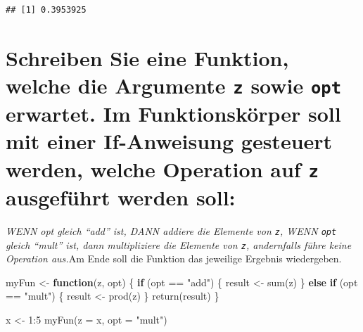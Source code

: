 \documentclass[12pt,a4paper]{article}
\newenvironment{Shaded}{\begin{snugshade}}{\end{snugshade}}
\newcommand{\AttributeTok}[1]{\textcolor[rgb]{0.77,0.63,0.00}{#1}}
\newcommand{\ControlFlowTok}[1]{\textcolor[rgb]{0.13,0.29,0.53}{\textbf{#1}}}
\newcommand{\DecValTok}[1]{\textcolor[rgb]{0.00,0.00,0.81}{#1}}
\newcommand{\FunctionTok}[1]{\textcolor[rgb]{0.00,0.00,0.00}{#1}}
\newcommand{\NormalTok}[1]{#1}
\newcommand{\OtherTok}[1]{\textcolor[rgb]{0.56,0.35,0.01}{#1}}
\newcommand{\SpecialCharTok}[1]{\textcolor[rgb]{0.00,0.00,0.00}{#1}}
\newcommand{\StringTok}[1]{\textcolor[rgb]{0.31,0.60,0.02}{#1}}
\begin{document}
\begin{verbatim}
## [1] 0.3953925
\end{verbatim}

\hypertarget{schreiben-sie-eine-funktion-welche-die-argumente-z-sowie-opt-erwartet.-im-funktionskuxf6rper-soll-mit-einer-if-anweisung-gesteuert-werden-welche-operation-auf-z-ausgefuxfchrt-werden-soll}{%
\section{\texorpdfstring{Schreiben Sie eine Funktion, welche die
Argumente \texttt{z} sowie \texttt{opt} erwartet. Im Funktionskörper
soll mit einer If-Anweisung gesteuert werden, welche Operation auf
\texttt{z} ausgeführt werden
soll:}{Schreiben Sie eine Funktion, welche die Argumente z sowie opt erwartet. Im Funktionskörper soll mit einer If-Anweisung gesteuert werden, welche Operation auf z ausgeführt werden soll:}}\label{schreiben-sie-eine-funktion-welche-die-argumente-z-sowie-opt-erwartet.-im-funktionskuxf6rper-soll-mit-einer-if-anweisung-gesteuert-werden-welche-operation-auf-z-ausgefuxfchrt-werden-soll}}

\emph{WENN opt gleich ``add'' ist, DANN addiere die Elemente von
\texttt{z}, WENN \texttt{opt} gleich ``mult'' ist, dann multipliziere
die Elemente von \texttt{z}, andernfalls führe keine Operation
aus.}\newline\newline Am Ende soll die Funktion das jeweilige Ergebnis
wiedergeben.

\begin{Shaded}
\begin{Highlighting}[]
\NormalTok{    myFun }\OtherTok{\textless{}{-}} \ControlFlowTok{function}\NormalTok{(z, opt) \{}
      \ControlFlowTok{if}\NormalTok{ (opt }\SpecialCharTok{==} \StringTok{"add"}\NormalTok{) \{}
\NormalTok{        result }\OtherTok{\textless{}{-}} \FunctionTok{sum}\NormalTok{(z)}
\NormalTok{      \} }\ControlFlowTok{else} \ControlFlowTok{if}\NormalTok{ (opt }\SpecialCharTok{==} \StringTok{"mult"}\NormalTok{) \{}
\NormalTok{        result }\OtherTok{\textless{}{-}} \FunctionTok{prod}\NormalTok{(z)}
\NormalTok{      \}}
      \FunctionTok{return}\NormalTok{(result)}
\NormalTok{    \}}
    
\NormalTok{    x }\OtherTok{\textless{}{-}} \DecValTok{1}\SpecialCharTok{:}\DecValTok{5}
    \FunctionTok{myFun}\NormalTok{(}\AttributeTok{z =}\NormalTok{ x, }\AttributeTok{opt =} \StringTok{"mult"}\NormalTok{)}
\end{Highlighting}
\end{Shaded}
\end{document}
